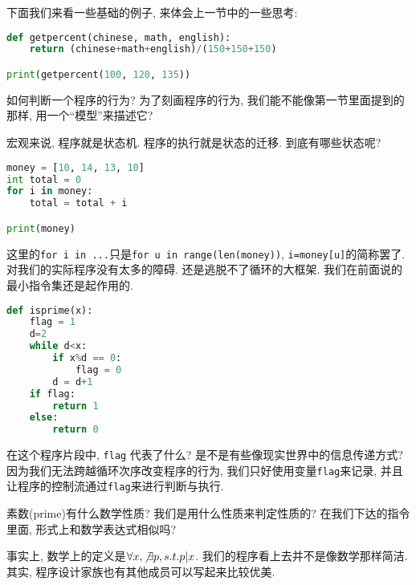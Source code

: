 下面我们来看一些基础的例子, 来体会上一节中的一些思考: 


\begin{lstlisting}[language=Python]
def getpercent(chinese, math, english): 
    return (chinese+math+english)/(150+150+150)

print(getpercent(100, 120, 135))
\end{lstlisting}

\begin{bonus}
如何判断一个程序的行为? 为了刻画程序的行为, 我们能不能像第一节里面提到的那样, 用一个``模型''来描述它?

宏观来说, 程序就是状态机. 程序的执行就是状态的迁移. 到底有哪些状态呢?
\end{bonus}


\begin{lstlisting}[language=Python]
money = [10, 14, 13, 10]
int total = 0
for i in money: 
    total = total + i

print(money)
\end{lstlisting}

这里的\texttt{for i in ...}只是\texttt{for u in range(len(money))}, \texttt{i=money[u]}的简称罢了. 对我们的实际程序没有太多的障碍. 还是逃脱不了循环的大框架. 我们在前面说的最小指令集还是起作用的. 


\begin{lstlisting}[language=Python]
def isprime(x): 
    flag = 1 
    d=2
    while d<x:
        if x%d == 0: 
            flag = 0
        d = d+1
    if flag: 
        return 1
    else: 
        return 0
\end{lstlisting}

在这个程序片段中, \texttt{flag} 代表了什么? 是不是有些像现实世界中的信息传递方式? 因为我们无法跨越循环次序改变程序的行为, 我们只好使用变量\texttt{flag}来记录, 并且让程序的控制流通过\texttt{flag}来进行判断与执行. 

\begin{bonus}
	素数(prime)有什么数学性质? 我们是用什么性质来判定性质的? 在我们下达的指令里面, 形式上和数学表达式相似吗? 
\end{bonus}

事实上, 数学上的定义是$\forall x, \not \exists p, s.t. p|x$. 我们的程序看上去并不是像数学那样简洁. 其实, 程序设计家族也有其他成员可以写起来比较优美. 

